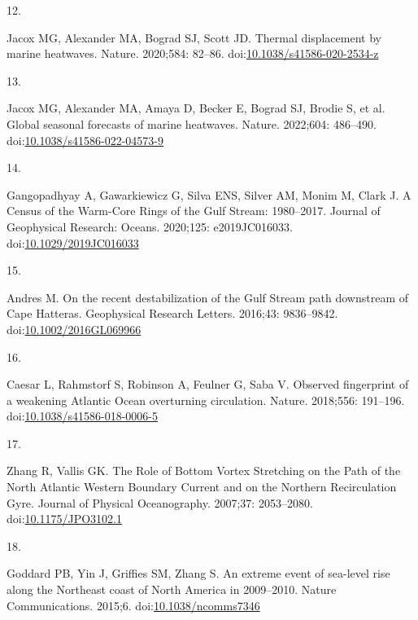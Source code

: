 \documentclass[
  10pt,
]{article}
\newlength{\cslhangindent}
\newlength{\csllabelwidth}
\newlength{\cslentryspacingunit} %
\newenvironment{CSLReferences}[2] %
 {%
  \setlength{\parindent}{0pt}
  \ifodd #1
  \let\oldpar\par
  \def\par{\hangindent=\cslhangindent\oldpar}
  \fi
  \setlength{\parskip}{#2\cslentryspacingunit}
 }%
 {}
\newcommand{\CSLLeftMargin}[1]{\parbox[t]{\csllabelwidth}{#1}}
\newcommand{\CSLRightInline}[1]{\parbox[t]{\linewidth - \csllabelwidth}{#1}\break}
\begin{document}
\begin{CSLReferences}{0}{0}
\leavevmode{}%
\CSLLeftMargin{12. }%
\CSLRightInline{Jacox MG, Alexander MA, Bograd SJ, Scott JD. Thermal displacement by marine heatwaves. Nature. 2020;584: 82--86. doi:\href{https://doi.org/10.1038/s41586-020-2534-z}{10.1038/s41586-020-2534-z}}

\leavevmode{}%
\CSLLeftMargin{13. }%
\CSLRightInline{Jacox MG, Alexander MA, Amaya D, Becker E, Bograd SJ, Brodie S, et al. Global seasonal forecasts of marine heatwaves. Nature. 2022;604: 486--490. doi:\href{https://doi.org/10.1038/s41586-022-04573-9}{10.1038/s41586-022-04573-9}}

\leavevmode{}%
\CSLLeftMargin{14. }%
\CSLRightInline{Gangopadhyay A, Gawarkiewicz G, Silva ENS, Silver AM, Monim M, Clark J. A {Census} of the {Warm}-{Core} {Rings} of the {Gulf} {Stream}: 1980--2017. Journal of Geophysical Research: Oceans. 2020;125: e2019JC016033. doi:\href{https://doi.org/10.1029/2019JC016033}{10.1029/2019JC016033}}

\leavevmode{}%
\CSLLeftMargin{15. }%
\CSLRightInline{Andres M. On the recent destabilization of the {Gulf} {Stream} path downstream of {Cape} {Hatteras}. Geophysical Research Letters. 2016;43: 9836--9842. doi:\href{https://doi.org/10.1002/2016GL069966}{10.1002/2016GL069966}}

\leavevmode{}%
\CSLLeftMargin{16. }%
\CSLRightInline{Caesar L, Rahmstorf S, Robinson A, Feulner G, Saba V. Observed fingerprint of a weakening {Atlantic} {Ocean} overturning circulation. Nature. 2018;556: 191--196. doi:\href{https://doi.org/10.1038/s41586-018-0006-5}{10.1038/s41586-018-0006-5}}

\leavevmode{}%
\CSLLeftMargin{17. }%
\CSLRightInline{Zhang R, Vallis GK. The {Role} of {Bottom} {Vortex} {Stretching} on the {Path} of the {North} {Atlantic} {Western} {Boundary} {Current} and on the {Northern} {Recirculation} {Gyre}. Journal of Physical Oceanography. 2007;37: 2053--2080. doi:\href{https://doi.org/10.1175/JPO3102.1}{10.1175/JPO3102.1}}

\leavevmode{}%
\CSLLeftMargin{18. }%
\CSLRightInline{Goddard PB, Yin J, Griffies SM, Zhang S. An extreme event of sea-level rise along the {Northeast} coast of {North} {America} in 2009--2010. Nature Communications. 2015;6. doi:\href{https://doi.org/10.1038/ncomms7346}{10.1038/ncomms7346}}


\end{CSLReferences}
\end{document}
